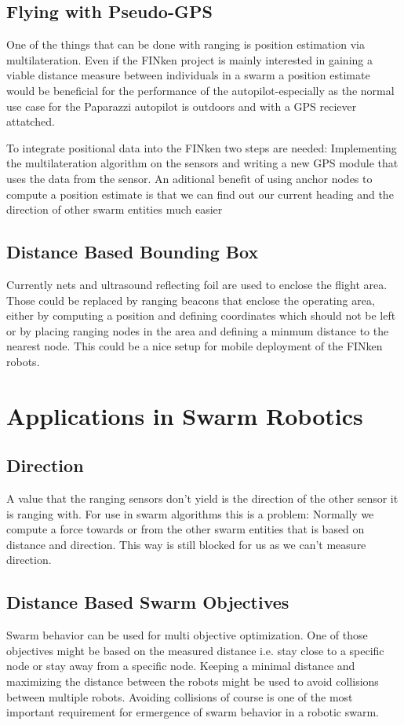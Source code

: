 \subsection{Flying with Pseudo-GPS}
One of the things that can be done with ranging is position estimation via multilateration.
Even if the FINken project is mainly interested in gaining a viable distance measure between individuals in a swarm a position estimate would be beneficial for the performance of the autopilot-especially as the normal use case for the Paparazzi autopilot is outdoors and with a GPS reciever attatched.

To integrate positional data into the FINken two steps are needed: Implementing the multilateration algorithm on the sensors and writing a new GPS module that uses the data from the sensor.
An aditional benefit of using anchor nodes to compute a position estimate is that we can find out our current heading and the direction of other swarm entities much easier

\subsection{Distance Based Bounding Box}
\label{boundingbox}
Currently nets and ultrasound reflecting foil are used to enclose the flight area.
Those could be replaced by ranging beacons that enclose the operating area, either by computing a position and defining coordinates which should not be left or by placing ranging nodes in the area and defining a minmum distance to the nearest node.
This could be a nice setup for mobile deployment of the FINken robots.


\section{Applications in Swarm Robotics}

\subsection{Direction}
A value that the ranging sensors don't yield is the direction of the other sensor it is ranging with.
For use in swarm algorithms this is a problem: Normally we compute a force towards or from the other swarm entities that is based on distance and direction.
This way is still blocked for us as we can't measure direction.

\subsection{Distance Based Swarm Objectives}
Swarm behavior can be used for multi objective optimization.
One of those objectives might be based on the measured distance i.e. stay close to a specific node or stay away from a specific node.
Keeping a minimal distance and maximizing the distance between the robots might be used to avoid collisions between multiple robots.
Avoiding collisions of course is one of the most important requirement for ermergence of swarm behavior in a robotic swarm.

